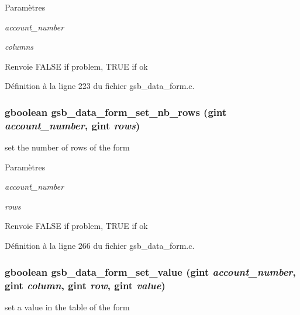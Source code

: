 \begin{DoxyParams}{Paramètres}
\item[{\em account\_\-number}]\item[{\em columns}]\end{DoxyParams}
\begin{DoxyReturn}{Renvoie}
FALSE if problem, TRUE if ok 
\end{DoxyReturn}


Définition à la ligne 223 du fichier gsb\_\-data\_\-form.c.

\subsubsection[{gsb\_\-data\_\-form\_\-set\_\-nb\_\-rows}]{\setlength{\rightskip}{0pt plus 5cm}gboolean gsb\_\-data\_\-form\_\-set\_\-nb\_\-rows (gint {\em account\_\-number}, \/  gint {\em rows})}\label{gsb__data__form_8h_aab897602de98433bb719ac14c3181479}
set the number of rows of the form


\begin{DoxyParams}{Paramètres}
\item[{\em account\_\-number}]\item[{\em rows}]\end{DoxyParams}
\begin{DoxyReturn}{Renvoie}
FALSE if problem, TRUE if ok 
\end{DoxyReturn}


Définition à la ligne 266 du fichier gsb\_\-data\_\-form.c.

\subsubsection[{gsb\_\-data\_\-form\_\-set\_\-value}]{\setlength{\rightskip}{0pt plus 5cm}gboolean gsb\_\-data\_\-form\_\-set\_\-value (gint {\em account\_\-number}, \/  gint {\em column}, \/  gint {\em row}, \/  gint {\em value})}\label{gsb__data__form_8h_a3451cf009bc77b47ab207415c06f5039}
set a value in the table of the form


